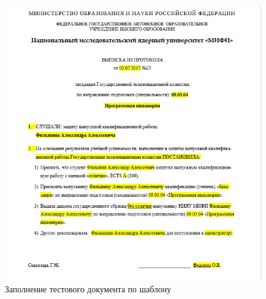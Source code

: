  	\begin{figure}
	\caption{Заполнение тестового документа по шаблону}
	\centering
	\includegraphics[width=\textwidth]{./screen2.jpg}
\end{figure}







